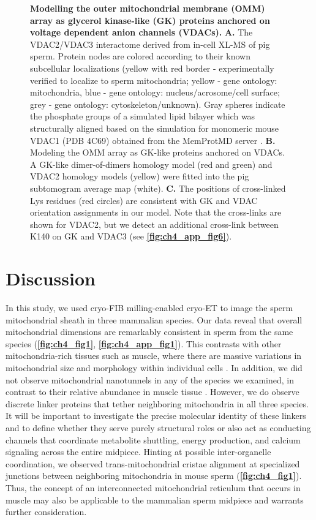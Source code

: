 \addtocounter{figure}{-1}
\begin{figure}[ht]
    \caption{\textbf{Modelling the outer mitochondrial membrane (OMM) array as glycerol kinase-like (GK) proteins anchored on voltage dependent anion channels (VDACs).} \textbf{A.} The VDAC2/VDAC3 interactome derived from in-cell XL-MS of pig sperm. Protein nodes are colored according to their known subcellular localizations (yellow with red border - experimentally verified to localize to sperm mitochondria; yellow - gene ontology: mitochondria, blue - gene ontology: nucleus/acrosome/cell surface; grey - gene ontology: cytoskeleton/unknown). Gray spheres indicate the phosphate groups of a simulated lipid bilayer which was structurally aligned based on the simulation for  monomeric mouse VDAC1 (PDB 4C69) obtained from the MemProtMD server \cite{Newport2019}. \textbf{B.} Modeling the OMM array as GK-like proteins anchored on VDACs. A GK-like dimer-of-dimers homology model (red and green) and VDAC2 homology models (yellow) were fitted into the pig subtomogram average map (white). \textbf{C.} The positions of cross-linked Lys residues (red circles) are consistent with GK and VDAC orientation assignments in our model. Note that the cross-links are shown for VDAC2, but we detect an additional cross-link between K140 on GK and VDAC3 (see \textbf{\autoref{fig:ch4_app_fig6}}).}
\end{figure}
%
\section{Discussion}
In this study, we used cryo-FIB milling-enabled cryo-ET to image the sperm mitochondrial sheath in three mammalian species. Our data reveal that overall mitochondrial dimensions are remarkably consistent in sperm from the same species (\textbf{\autoref{fig:ch4_fig1}}, \textbf{\autoref{fig:ch4_app_fig1}}). This contrasts with other mitochondria-rich tissues such as muscle, where there are massive variations in mitochondrial size and morphology within individual cells \cite{Vincent2019}. In addition, we did not observe mitochondrial nanotunnels in any of the species we examined, in contrast to their relative abundance in muscle tissue \cite{Vincent2017, Vincent2019}. However, we do observe discrete linker proteins that tether neighboring mitochondria in all three species. It will be important to investigate the precise molecular identity of these linkers and to define whether they serve purely structural roles or also act as conducting channels that coordinate metabolite shuttling, energy production, and calcium signaling across the entire midpiece. Hinting at possible inter-organelle coordination, we observed trans-mitochondrial cristae alignment at specialized junctions between neighboring mitochondria in mouse sperm (\textbf{\autoref{fig:ch4_fig1}}). Thus, the concept of an interconnected mitochondrial reticulum that occurs in muscle \cite{Glancy2015} may also be applicable to the ma\-mmalian sperm midpiece and warrants further consideration.

